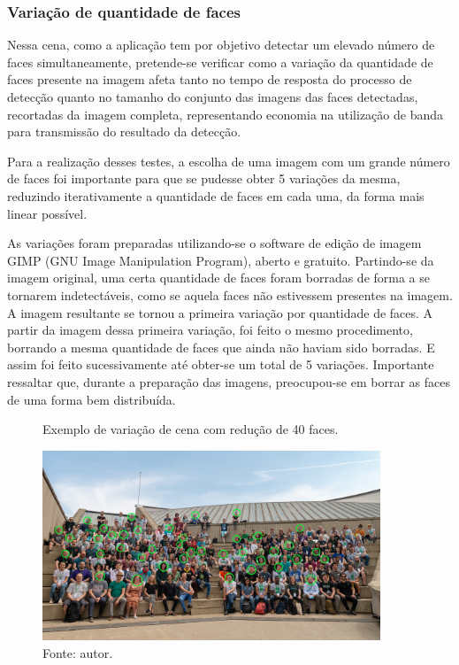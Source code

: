 

\subsubsection{Variação de quantidade de faces}

Nessa cena, como a aplicação tem por objetivo detectar um elevado número de faces simultaneamente, pretende-se verificar como a variação da quantidade de faces presente na imagem afeta tanto no tempo de resposta do processo de detecção quanto no tamanho do conjunto das imagens das faces detectadas, recortadas da imagem completa, representando economia na utilização de banda para transmissão do resultado da detecção.

Para a realização desses testes, a escolha de uma imagem com um grande número de faces foi importante para que se pudesse obter 5 variações da mesma, reduzindo iterativamente a quantidade de faces em cada uma, da forma mais linear possível.

As variações foram preparadas utilizando-se o software de edição de imagem GIMP (GNU Image Manipulation Program), aberto e gratuito. Partindo-se da imagem original, uma certa quantidade de faces foram borradas de forma a se tornarem indetectáveis, como se aquela faces não estivessem presentes na imagem. A imagem resultante se tornou a primeira variação por quantidade de faces. A partir da imagem dessa primeira variação, foi feito o mesmo procedimento, borrando a mesma quantidade de faces que ainda não haviam sido borradas. E assim foi feito sucessivamente até obter-se um total de 5 variações. Importante ressaltar que, durante a preparação das imagens, preocupou-se em borrar as faces de uma forma bem distribuída.

\begin{figure}[h]
    \centering
    \caption[Exemplo de variação de cena com redução de 40 faces.]{Exemplo de variação de cena com redução de 40 faces.}
    \includegraphics[width=0.9\textwidth]{Cap3_Desenvolvimento/Figures/exemplo_variacao_faces.jpg}
    \caption*{Fonte: autor.}
    \label{fig:exemploVariacaoFaces}
\end{figure}

